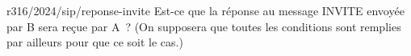 \begin{question}{r316/2024/sip/reponse-invite}
  Est-ce que la réponse au message INVITE envoyée par B sera reçue
  par A~? (On supposera que toutes les conditions sont remplies par
  ailleurs pour que ce soit le cas.)
  \begin{reponses}
  \end{reponses}
\end{question}